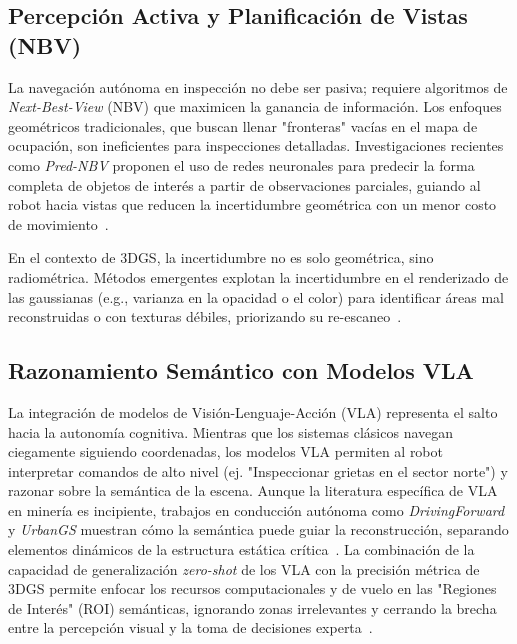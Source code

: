 \documentclass[12pt,a4paper]{article}
\begin{document}
	\subsection{Percepción Activa y Planificación de Vistas (NBV)}
	La navegación autónoma en inspección no debe ser pasiva; requiere algoritmos de \textit{Next-Best-View} (NBV) que maximicen la ganancia de información. Los enfoques geométricos tradicionales, que buscan llenar "fronteras" vacías en el mapa de ocupación, son ineficientes para inspecciones detalladas. Investigaciones recientes como \textit{Pred-NBV} proponen el uso de redes neuronales para predecir la forma completa de objetos de interés a partir de observaciones parciales, guiando al robot hacia vistas que reducen la incertidumbre geométrica con un menor costo de movimiento~\cite{dhami2023prednbv}.
	
	En el contexto de 3DGS, la incertidumbre no es solo geométrica, sino radiométrica. Métodos emergentes explotan la incertidumbre en el renderizado de las gaussianas (e.g., varianza en la opacidad o el color) para identificar áreas mal reconstruidas o con texturas débiles, priorizando su re-escaneo~\cite{zhang2025autonomous, horizongs2025}.
	
	\subsection{Razonamiento Semántico con Modelos VLA}
	La integración de modelos de Visión-Lenguaje-Acción (VLA) representa el salto hacia la autonomía cognitiva. Mientras que los sistemas clásicos navegan ciegamente siguiendo coordenadas, los modelos VLA permiten al robot interpretar comandos de alto nivel (ej. "Inspeccionar grietas en el sector norte") y razonar sobre la semántica de la escena. Aunque la literatura específica de VLA en minería es incipiente, trabajos en conducción autónoma como \textit{DrivingForward} y \textit{UrbanGS} muestran cómo la semántica puede guiar la reconstrucción, separando elementos dinámicos de la estructura estática crítica~\cite{li2024drivingforward, urbangs2024}. La combinación de la capacidad de generalización \textit{zero-shot} de los VLA con la precisión métrica de 3DGS permite enfocar los recursos computacionales y de vuelo en las "Regiones de Interés" (ROI) semánticas, ignorando zonas irrelevantes y cerrando la brecha entre la percepción visual y la toma de decisiones experta~\cite{zhang2025autonomous}.
	
	

	
	
\end{document}
